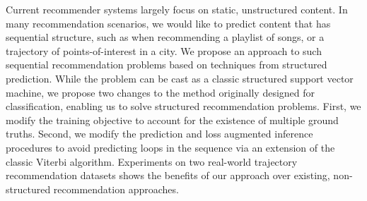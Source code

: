 
Current recommender systems largely focus on static, unstructured content.
In many recommendation scenarios, we would like to predict content that has sequential structure,
such as when recommending a playlist of songs, or a trajectory of points-of-interest in a city.
We propose an approach to such sequential recommendation problems based on techniques from structured prediction.
While the problem can be cast as a classic structured support vector machine,
we propose two changes to the method originally designed for classification,
enabling us to solve structured recommendation problems.
First, we modify the training objective to account for the existence of multiple ground truths.
Second, we modify the prediction and loss augmented inference procedures to avoid predicting loops in the sequence via an extension of the classic Viterbi algorithm.
Experiments on two real-world trajectory recommendation datasets shows the benefits of our approach over existing, non-structured recommendation approaches.
